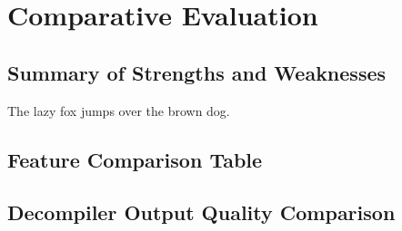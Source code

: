 \cleardoubleoddpage%
\chapter{Comparative Evaluation}
\label{sec:comparison}


\section{Summary of Strengths and Weaknesses}
\label{sec:comparison:qualities}
The lazy fox jumps over the brown dog.


\section{Feature Comparison Table}
\label{sec:comparison:features}


\section{Decompiler Output Quality Comparison}
\label{sec:comparison:quality}


